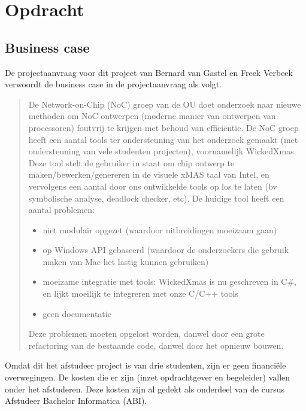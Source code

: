 
\section{Opdracht}

\subsection{Business case}

De projectaanvraag voor dit project van Bernard van Gastel en
Freek Verbeek verwoordt de business case in de projectaanvraag
als volgt.

\begin{quote}
    \tiny
    De Network-on-Chip (NoC) groep van de OU doet onderzoek
    naar nieuwe methoden om NoC ontwerpen (moderne manier van
    ontwerpen van processoren) foutvrij te krijgen met behoud van
    efficiëntie. De NoC groep heeft een aantal tools ter ondersteuning
    van het onderzoek gemaakt (met ondersteuning van vele studenten
    projecten), voornamelijk WickedXmas. Deze tool stelt de
    gebruiker in staat om chip ontwerp te maken/bewerken/genereren
    in de visuele xMAS taal van Intel, en vervolgens een aantal door
    ons ontwikkelde tools op los te laten (bv symbolische analyse,
    deadlock checker, etc).
    De huidige tool heeft een aantal problemen:

    \begin{itemize}
	\item niet modulair opgezet (waardoor uitbreidingen moeizaam gaan)
	\item op Windows API gebaseerd (waardoor de onderzoekers die
	    gebruik maken van Mac het lastig kunnen gebruiken)
	\item moeizame integratie met tools: WickedXmas is nu geschreven
	    in C\#, en lijkt moeilijk te integreren met onze C/C++ tools
	\item geen documentatie
    \end{itemize}

    Deze problemen moeten opgelost worden, danwel door een grote
    refactoring van de bestaande code, danwel door het opnieuw
    bouwen.
\end{quote}

Omdat dit het afstudeer project is van drie studenten, zijn er geen financi\"ele overwegingen.
De kosten die er zijn (inzet opdrachtgever en begeleider) vallen onder het afstuderen. Deze kosten
zijn al gedekt als onderdeel van de cursus Afstudeer Bachelor Informatica (ABI).

